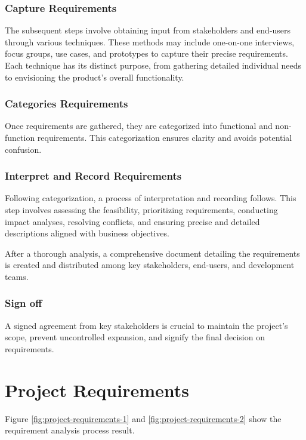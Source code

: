 \subsubsection{Capture Requirements}
The subsequent steps involve obtaining input from stakeholders and end-users through various techniques. These methods may include one-on-one interviews, focus groups, use cases, and prototypes to capture their precise requirements. Each technique has its distinct purpose, from gathering detailed individual needs to envisioning the product's overall functionality.

\subsubsection{Categories Requirements}
Once requirements are gathered, they are categorized into functional and non-function requirements. This categorization ensures clarity and avoids potential confusion.

\subsubsection{Interpret and Record Requirements}
Following categorization, a process of interpretation and recording follows. This step involves assessing the feasibility, prioritizing requirements, conducting impact analyses, resolving conflicts, and ensuring precise and detailed descriptions aligned with business objectives.

After a thorough analysis, a comprehensive document detailing the requirements is created and distributed among key stakeholders, end-users, and development teams.

\subsubsection{Sign off}
A signed agreement from key stakeholders is crucial to maintain the project's scope, prevent uncontrolled expansion, and signify the final decision on requirements.

\section{Project Requirements}
\label{section:project-requirements}

Figure \ref{fig:project-requirements-1} and \ref{fig:project-requirements-2} show the requirement analysis process result.

